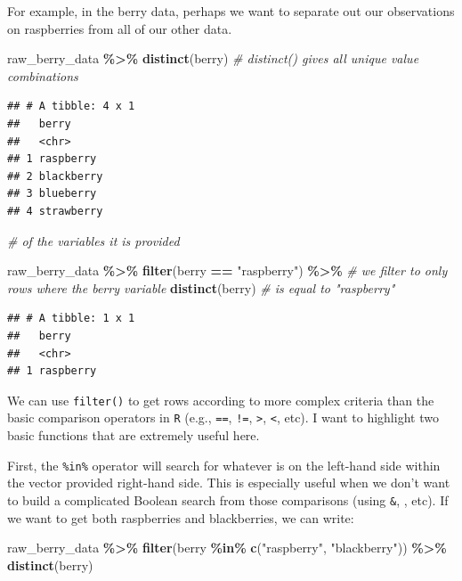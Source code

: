 \documentclass[
]{book}
\newenvironment{Shaded}{\begin{snugshade}}{\end{snugshade}}
\newcommand{\CommentTok}[1]{\textcolor[rgb]{0.56,0.35,0.01}{\textit{#1}}}
\newcommand{\FunctionTok}[1]{\textcolor[rgb]{0.13,0.29,0.53}{\textbf{#1}}}
\newcommand{\NormalTok}[1]{#1}
\newcommand{\SpecialCharTok}[1]{\textcolor[rgb]{0.81,0.36,0.00}{\textbf{#1}}}
\newcommand{\StringTok}[1]{\textcolor[rgb]{0.31,0.60,0.02}{#1}}
\begin{document}
For example, in the berry data, perhaps we want to separate out our observations on raspberries from all of our other data.

\begin{Shaded}
\begin{Highlighting}[]
\NormalTok{raw\_berry\_data }\SpecialCharTok{\%\textgreater{}\%}
  \FunctionTok{distinct}\NormalTok{(berry)                   }\CommentTok{\# distinct() gives all unique value combinations}
\end{Highlighting}
\end{Shaded}

\begin{verbatim}
## # A tibble: 4 x 1
##   berry     
##   <chr>     
## 1 raspberry 
## 2 blackberry
## 3 blueberry 
## 4 strawberry
\end{verbatim}

\begin{Shaded}
\begin{Highlighting}[]
\CommentTok{\# of the variables it is provided}

\NormalTok{raw\_berry\_data }\SpecialCharTok{\%\textgreater{}\%}
  \FunctionTok{filter}\NormalTok{(berry }\SpecialCharTok{==} \StringTok{"raspberry"}\NormalTok{) }\SpecialCharTok{\%\textgreater{}\%}  \CommentTok{\# we filter to only rows where the berry variable}
  \FunctionTok{distinct}\NormalTok{(berry)                   }\CommentTok{\# is equal to "raspberry"}
\end{Highlighting}
\end{Shaded}

\begin{verbatim}
## # A tibble: 1 x 1
##   berry    
##   <chr>    
## 1 raspberry
\end{verbatim}

We can use \texttt{filter()} to get rows according to more complex criteria than the basic comparison operators in \texttt{R} (e.g., \texttt{==}, \texttt{!=}, \texttt{\textgreater{}}, \texttt{\textless{}}, etc). I want to highlight two basic functions that are extremely useful here.

First, the \texttt{\%in\%} operator will search for whatever is on the left-hand side within the vector provided right-hand side. This is especially useful when we don't want to build a complicated Boolean search from those comparisons (using \texttt{\&}, \texttt{\textbar{}}, etc). If we want to get both raspberries and blackberries, we can write:

\begin{Shaded}
\begin{Highlighting}[]
\NormalTok{raw\_berry\_data }\SpecialCharTok{\%\textgreater{}\%}
  \FunctionTok{filter}\NormalTok{(berry }\SpecialCharTok{\%in\%} \FunctionTok{c}\NormalTok{(}\StringTok{"raspberry"}\NormalTok{, }\StringTok{"blackberry"}\NormalTok{)) }\SpecialCharTok{\%\textgreater{}\%}
  \FunctionTok{distinct}\NormalTok{(berry)}
\end{Highlighting}
\end{Shaded}
\end{document}
